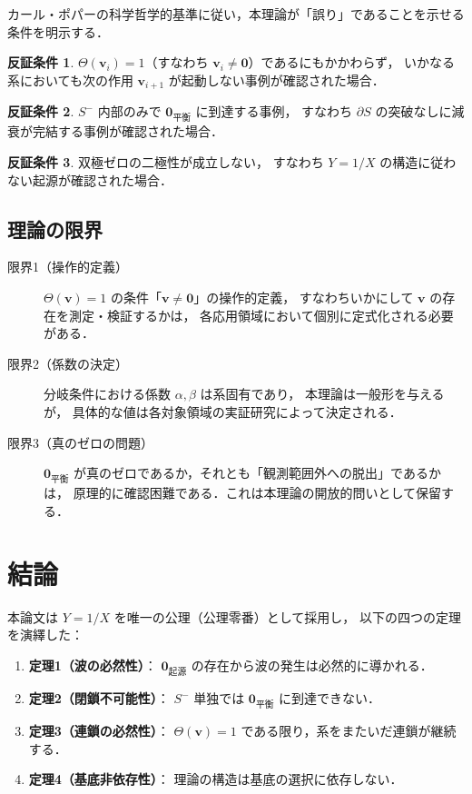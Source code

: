 \documentclass[12pt, a4paper]{article}
\theoremstyle{definition}
\newtheorem{condition}{反証条件}
\newcommand{\vzero}{\mathbf{0}}
\newcommand{\vorigin}{\mathbf{0}_{\text{起源}}}
\newcommand{\vequil}{\mathbf{0}_{\text{平衡}}}
\newcommand{\Switch}{\Theta}
\begin{document}
カール・ポパーの科学哲学的基準に従い，本理論が「誤り」であることを示せる条件を明示する．

\begin{condition}
  $\Switch(\mathbf{v}_i) = 1$（すなわち $\mathbf{v}_i \neq \vzero$）であるにもかかわらず，
  いかなる系においても次の作用 $\mathbf{v}_{i+1}$ が起動しない事例が確認された場合．
\end{condition}

\begin{condition}
  $S^-$ 内部のみで $\vequil$ に到達する事例，
  すなわち $\partial S$ の突破なしに減衰が完結する事例が確認された場合．
\end{condition}

\begin{condition}
  双極ゼロの二極性が成立しない，
  すなわち $Y = 1/X$ の構造に従わない起源が確認された場合．
\end{condition}

\subsection{理論の限界}

\begin{description}
  \item[限界1（操作的定義）]
    $\Switch(\mathbf{v}) = 1$ の条件「$\mathbf{v} \neq \vzero$」の操作的定義，
    すなわちいかにして $\mathbf{v}$ の存在を測定・検証するかは，
    各応用領域において個別に定式化される必要がある．

  \item[限界2（係数の決定）]
    分岐条件における係数 $\alpha, \beta$ は系固有であり，
    本理論は一般形を与えるが，
    具体的な値は各対象領域の実証研究によって決定される．

  \item[限界3（真のゼロの問題）]
    $\vequil$ が真のゼロであるか，それとも「観測範囲外への脱出」であるかは，
    原理的に確認困難である．これは本理論の開放的問いとして保留する．
\end{description}

\section{結論}

本論文は $Y = 1/X$ を唯一の公理（公理零番）として採用し，
以下の四つの定理を演繹した：

\begin{enumerate}
  \item \textbf{定理1（波の必然性）}：
        $\vorigin$ の存在から波の発生は必然的に導かれる．
  \item \textbf{定理2（閉鎖不可能性）}：
        $S^-$ 単独では $\vequil$ に到達できない．
  \item \textbf{定理3（連鎖の必然性）}：
        $\Switch(\mathbf{v}) = 1$ である限り，系をまたいだ連鎖が継続する．
  \item \textbf{定理4（基底非依存性）}：
        理論の構造は基底の選択に依存しない．
\end{enumerate}
\end{document}
